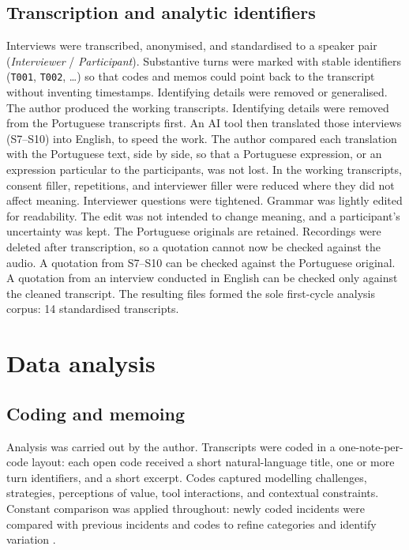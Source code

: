 \subsection{Transcription and analytic identifiers}
\label{subsec:method_transcription}

Interviews were transcribed, anonymised, and standardised to a speaker pair (\emph{Interviewer} / \emph{Participant}). Substantive turns were marked with stable identifiers (\texttt{T001}, \texttt{T002}, \ldots) so that codes and memos could point back to the transcript without inventing timestamps. Identifying details were removed or generalised. The author produced the working transcripts. Identifying details were removed from the Portuguese transcripts first. An AI tool then translated those interviews (S7--S10) into English, to speed the work. The author compared each translation with the Portuguese text, side by side, so that a Portuguese expression, or an expression particular to the participants, was not lost. In the working transcripts, consent filler, repetitions, and interviewer filler were reduced where they did not affect meaning. Interviewer questions were tightened. Grammar was lightly edited for readability. The edit was not intended to change meaning, and a participant's uncertainty was kept. The Portuguese originals are retained. Recordings were deleted after transcription, so a quotation cannot now be checked against the audio. A quotation from S7--S10 can be checked against the Portuguese original. A quotation from an interview conducted in English can be checked only against the cleaned transcript. The resulting files formed the sole first-cycle analysis corpus: 14 standardised transcripts.

\section{Data analysis}
\label{sec:method_analysis}

\subsection{Coding and memoing}
\label{subsec:method_coding}

Analysis was carried out by the author. Transcripts were coded in a one-note-per-code layout: each open code received a short natural-language title, one or more turn identifiers, and a short excerpt. Codes captured modelling challenges, strategies, perceptions of value, tool interactions, and contextual constraints. Constant comparison was applied throughout: newly coded incidents were compared with previous incidents and codes to refine categories and identify variation \cite{adolph2011using}.

